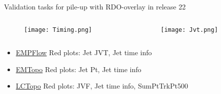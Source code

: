 

\begin{frame}{Validation tasks for pile-up with RDO-overlay in release 22}
    \begin{columns}
        \begin{column}{0.5\textwidth}
            \begin{figure}
                \centering
                \texttt{[image: Timing.png]}
            \end{figure}
        \end{column}
        \begin{column}{0.5\textwidth}
            \begin{figure}
                \centering
                \texttt{[image: Jvt.png]}
            \end{figure}
        \end{column}
    \end{columns}
        \begin{itemize}
        \item \href{https://atlas-computing.web.cern.ch/atlas-computing/links/PhysValDir/JetEtMiss/jet_26-05-21_RDOOverlay_ckirfel/AntiKt4EMPFlowJets/index.html}{EMPFlow} Red plots: Jet JVT, Jet time info
        \item \href{https://atlas-computing.web.cern.ch/atlas-computing/links/PhysValDir/JetEtMiss/jet_26-05-21_RDOOverlay_ckirfel/AntiKt4EMTopoJets/index.html}{EMTopo} Red plots: Jet Pt, Jet time info
        \item \href{https://atlas-computing.web.cern.ch/atlas-computing/links/PhysValDir/JetEtMiss/jet_26-05-21_RDOOverlay_ckirfel/AntiKt4LCTopoJets/index.html}{LCTopo} Red plots: JVF, Jet time info, SumPtTrkPt500
    \end{itemize}
\end{frame}